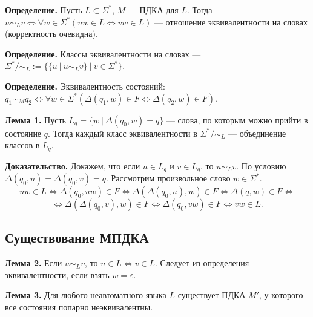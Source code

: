 \textbf{Определение.} Пусть $L \subset \Sigma^*$, $M$ --- ПДКА для $L$. Тогда $u \sim_L v \iff \forall w \in \Sigma^* (uw \in L \iff vw \in L)$ --- отношение эквивалентности на словах (корректность очевидна).

\textbf{Определение.} Классы эквивалентности на словах --- $\Sigma^* / \sim_L := \{\{u~|~u \sim_L v \}~|~v \in \Sigma^* \}$.

\textbf{Определение.} Эквивалентность состояний: $q_1 \sim_M q_2 \iff \forall w \in \Sigma^* (\Delta(q_1, w) \in F \iff \Delta(q_2, w) \in F)$.

\textbf{Лемма 1.} Пусть $L_q = \{w~|~ \Delta(q_0, w) = q\}$ --- слова, по которым можно прийти в состояние $q$.
Тогда каждый класс эквивалентности в $\Sigma^* / \sim_L$ --- объединение классов в $L_q$.

\textbf{Доказательство.} Докажем, что если $u \in L_q$ и $v \in L_q$, то $u \sim_L v$.
По условию $\Delta(q_0, u) = \Delta(q_0, v) = q$.
Рассмотрим произвольное слово $w \in \Sigma^*$.
\[
    uw \in L \iff \Delta(q_0, uw) \in F \iff \Delta(\Delta(q_0, u), w) \in F \iff \Delta(q, w) \in F \iff
\]
\[
    \iff \Delta(\Delta(q_0, v), w) \in F \iff \Delta(q_0, vw) \in F \iff vw \in L.
\]

\QED


\subsection{Существование МПДКА}
\textbf{Лемма 2.} Если $u \sim_L v$, то $u \in L \iff v \in L$. Следует из определения эквивалентности, если взять $w = \varepsilon$.

\textbf{Лемма 3.} Для любого неавтоматного языка $L$ существует ПДКА $M'$, у которого все состояния попарно неэквивалентны.

